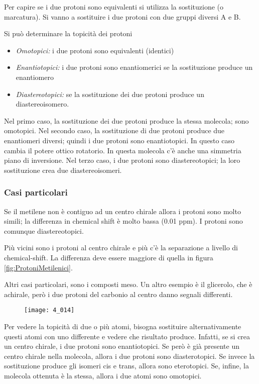 Per capire se i due protoni sono equivalenti si utilizza la sostituzione
(o marcatura). Si vanno a sostituire i due protoni con due gruppi
diversi A e B.

Si può determinare la topicità dei protoni
\begin{itemize}
  \item \textit{Omotopici:} i due protoni sono equivalenti (identici)
  \item \textit{Enantiotopici:} i due protoni sono enantiomerici se la sostituzione produce un enantiomero
  \item \textit{Diastereotopici:} se la sostituzione dei due protoni produce un diastereoisomero.
\end{itemize}

Nel primo caso, la sostituzione dei due protoni produce la stessa
molecola; sono omotopici.
Nel secondo caso, la sostituzione di due protoni produce due enantiomeri
diversi; quindi i due protoni sono enantiotopici. In questo caso cambia
il potere ottico rotatorio. In questa molecola c'è anche una simmetria
piano di inversione.
Nel terzo caso, i due protoni sono diastereotopici; la loro sostituzione
crea due diastereoisomeri.

\subsubsection{Casi particolari}

Se il metilene non è contiguo ad un centro chirale allora i protoni sono
molto simili; la differenza in chemical shift è molto bassa (0.01 ppm). I
protoni sono comunque diastereotopici.

Più vicini sono i protoni al centro chirale e più c'è la separazione a
livello di chemical-shift. La differenza deve essere maggiore di quella
in figura \ref{fig:ProtoniMetilenici}.


Altri casi particolari, sono i composti meso.
Un altro esempio è il glicerolo, che è achirale, però i due protoni del carbonio al
centro danno segnali differenti.

\begin{figure}
  \texttt{[image: 4\_014]}
\end{figure}

Per vedere la topicità di due o più atomi, bisogna sostituire alternativamente questi atomi con uno differente e vedere che risultato produce. Infatti, se si crea un centro chirale, i due protoni sono enantiotopici. Se però è già presente un centro chirale nella molecola, allora i due protoni sono diasterotopici. Se invece la sostituzione produce gli isomeri cis e trans, allora sono eterotopici. Se, infine, la molecola ottenuta è la stessa, allora i due atomi sono omotopici.


